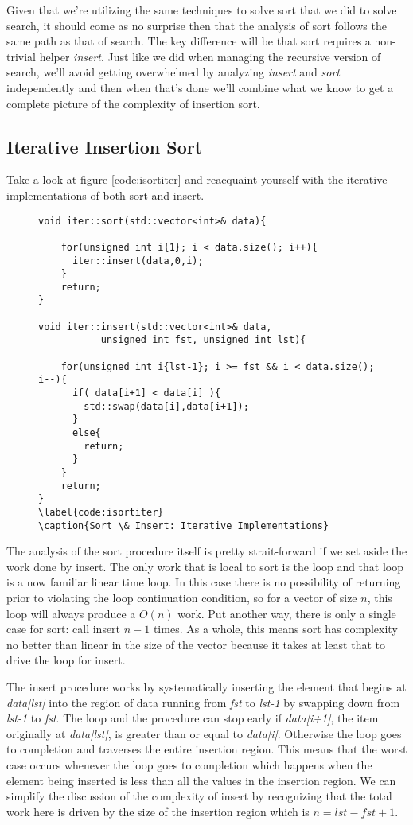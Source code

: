 \documentclass[]{tufte-handout}
\begin{document}
Given that we're utilizing the same techniques to solve sort that we did to solve search, it should come as no surprise then that the analysis of sort follows the same path as that of search. The key difference will be that sort requires a non-trivial helper \textit{insert}. Just like we did when managing the recursive version of search, we'll avoid getting overwhelmed by analyzing \textit{insert} and \textit{sort} independently and then when that's done we'll combine what we know to get a complete picture of the complexity of insertion sort. 

\subsection{Iterative Insertion Sort}

Take a look at figure \ref{code:isortiter} and reacquaint yourself with the iterative implementations of both sort and insert.
\begin{figure}
\begin{lstlisting}
void iter::sort(std::vector<int>& data){

    for(unsigned int i{1}; i < data.size(); i++){
      iter::insert(data,0,i);
    }
    return;
}

void iter::insert(std::vector<int>& data,
		   unsigned int fst, unsigned int lst){

    for(unsigned int i{lst-1}; i >= fst && i < data.size(); i--){
      if( data[i+1] < data[i] ){
		std::swap(data[i],data[i+1]);
      }
      else{
		return;
      }
    }
    return;
}
\label{code:isortiter}
\caption{Sort \& Insert: Iterative Implementations}
\end{lstlisting}
\end{figure}

The analysis of the sort procedure itself is pretty strait-forward if we set aside the work done by insert. The only work that is local to sort is the loop and that loop is a now familiar linear time loop. In this case there is no possibility of returning prior to violating the loop continuation condition, so for a vector of size $n$, this loop will always produce a $O(n)$ work. Put another way, there is only a single case for sort: call insert $n-1$ times. As a whole, this means sort has complexity no better than linear in the size of the vector because it takes at least that to drive the loop for insert. 

The insert procedure works by systematically inserting the element that begins at \textit{data[lst]} into the region of data running from \textit{fst} to \textit{lst-1} by swapping down from \textit{lst-1} to \textit{fst}. The loop and the procedure can stop early if \textit{data[i+1]}, the item originally at \textit{data[lst]}, is greater than or equal to \textit{data[i]}. Otherwise the loop goes to completion and traverses the entire insertion region. This means that the worst case occurs whenever the loop goes to completion which happens when the element being inserted is less than all the values in the insertion region. We can simplify the discussion of the complexity of insert by recognizing that the total work here is driven by the size of the insertion region which is $n=lst-fst+1$.
\end{document}
